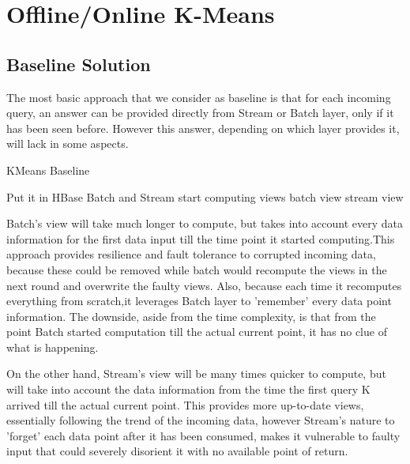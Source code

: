 \documentclass{lmproj}
\begin{document}
\chapter{Offline/Online K-Means}
\label{kmeans}

\section{Baseline Solution}
\label{kmeans}

The most basic approach that we consider as baseline is that for each incoming query, an answer can be provided directly from Stream or Batch layer, only if it has been seen before. However this answer, depending on which layer provides it, will lack in some aspects.

\bigskip
\begin{algorithm}[H]
	\caption{KMeans Baseline}\label{kmeansbaseline}
	\begin{algorithmic}[1]
		
		\State Put it in HBase
		\State Batch and Stream start computing views
		\Else 
		\State \Return batch view
		\State \Return stream view
		\EndIf
		\EndIf			
		
		\EndProcedure
	\end{algorithmic}
\end{algorithm}

Batch's view will take much longer to compute, but takes into account every data information for the first data input till the time point it started computing.This approach provides resilience and fault tolerance to corrupted incoming data, because these could be removed while batch would recompute the views in the next round and overwrite the faulty views. Also, because each time it recomputes everything from scratch,it leverages Batch layer to 'remember' every data point information. The downside, aside from the time complexity, is that from the point Batch started computation till the actual current point, it has no clue of what is happening. 

On the other hand, Stream's view will be many times quicker to compute, but will take into account the data information from the time the first query K arrived till the actual current point. This provides more up-to-date views, essentially following the trend of the incoming data, however Stream's nature to 'forget' each data point after it has been consumed, makes it vulnerable to faulty input that could severely disorient it with no available point of return.
\end{document}
